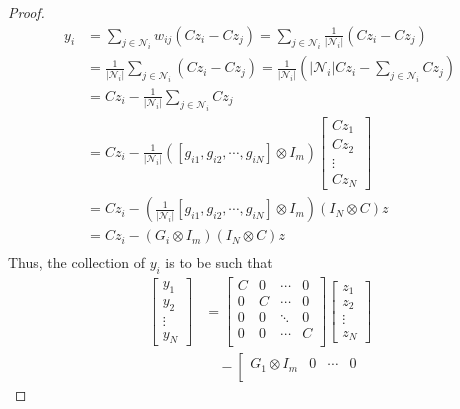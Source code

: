 \documentclass[11pt, a4paper, oneside, openany, reqno]{book}
\theoremstyle{definition}
\theoremstyle{remark}
\numberwithin{equation}{chapter} %
\newcommand{\NBR}{\mathcal{N}}
\begin{document}
\begin{proof}
	\begin{equation}\begin{split}
	y_i & =\sum_{j \in \NBR_i}w_{ij}(Cz_i-Cz_j)
	=\sum_{j \in \NBR_i}\frac{1}{\vert \NBR_i \vert}(Cz_i-Cz_j) \\
	&=\frac{1}{\vert \NBR_i \vert}\sum_{j \in \NBR_i}(Cz_i-Cz_j) 
	=\frac{1}{\vert \NBR_i \vert} ( \vert \NBR_i \vert Cz_i - \sum_{j \in \NBR_i}Cz_j )  \\
	&=Cz_i - \frac{1}{\vert \NBR_i \vert} \sum_{j \in \NBR_i}Cz_j \\
	&=Cz_i - \frac{1}{\vert \NBR_i \vert} (\left[ g_{i1}, g_{i2},\cdots, g_{iN} \right] \otimes I_m)
	\left[ \begin{array}{c} Cz_1 \\ Cz_2 \\ \vdots \\ Cz_N \end{array}  \right] \\
	&=Cz_i - (\frac{1}{\vert \NBR_i \vert} \left[ g_{i1}, g_{i2},\cdots, g_{iN} \right] \otimes I_m)
	(I_N \otimes C)z \\
	&=Cz_i - (G_i \otimes I_m)(I_N \otimes C)z \\
	\end{split}\end{equation}	
	Thus, the collection of $ y_i $ is to be such that
	\begin{equation}\begin{split}
	\left[ \begin{array}{c} y_1 \\ y_2 \\  \vdots \\ y_N \end{array}  \right] &=
	\left[ \begin{array}{cccc} C & 0 & \cdots & 0\\
	0 & C & \cdots & 0 \\
	0 & 0 & \ddots & 0 \\
	0 & 0 & \cdots & C \\
	  \end{array} \right]
	\left[ \begin{array}{c} z_1 \\ z_2 \\  \vdots \\ z_N \end{array}  \right] \\
	& \quad - \left[ \begin{array}{cccc} G_1 \otimes I_m  & 0 & \cdots & 0\\

\end{array}
\end{split}
\end{equation}
\end{proof}
\end{document}
